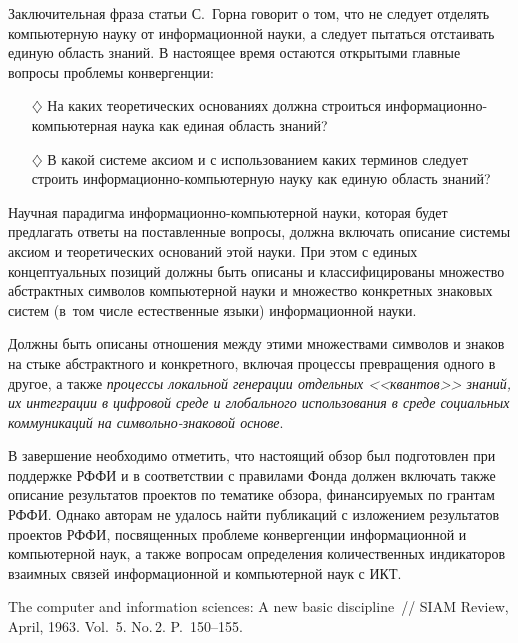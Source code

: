 \begin{multicols}{2}
      Заключительная фраза статьи С.~Горна говорит о том, что не следует отделять
компьютерную науку от информационной науки, а следует пытаться отстаивать единую
область знаний. В настоящее время остаются открытыми главные вопросы проблемы
конвергенции:
\begin{itemize}
\item[$\diamondsuit$] На каких теоретических основаниях должна строиться информационно-компьютерная наука как единая область знаний?
\item[$\diamondsuit$] В какой системе аксиом и с использованием каких терминов следует строить
информационно-компьютерную науку как единую область знаний?
\end{itemize}

      Научная парадигма информацион\-но-компью\-тер\-ной науки, которая будет предлагать
ответы на поставленные вопросы, должна включать описание системы аксиом и теоретических
оснований этой науки. При этом с единых концептуальных позиций должны быть описаны и
классифицированы множество абстрактных символов компьютерной науки и множество
конкретных знаковых систем (в~том числе естественные языки) информационной науки.

      Должны быть описаны отношения между этими множествами символов и знаков на
стыке абстрактного и конкретного, включая процессы превращения одного в другое, а также
\textit{процессы локальной генерации отдельных <<квантов>> знаний, их интеграции в
цифровой среде и глобального использования в среде социальных коммуникаций на
      символьно-знаковой основе}.

      \bigskip
      В завершение необходимо отметить, что настоящий обзор был подготовлен при
поддержке \mbox{РФФИ} и в соответствии с правилами Фонда должен включать также описание
результатов проектов по тематике обзора, финансируемых по грантам \mbox{РФФИ}. Однако авторам
не удалось найти публикаций с изложением результатов проектов \mbox{РФФИ}, посвященных
проблеме конвергенции информационной и компьютерной наук, а также вопросам определения
количественных индикаторов взаимных связей информационной и компьютерной наук с ИКТ.

{\small\frenchspacing
{\baselineskip=10.8pt
\begin{thebibliography}{99}

      The computer and information sciences: A new basic discipline~// SIAM Review,
April, 1963. Vol.~5. No.\,2. P.~150--155.


\end{thebibliography}}}
\end{multicols}

